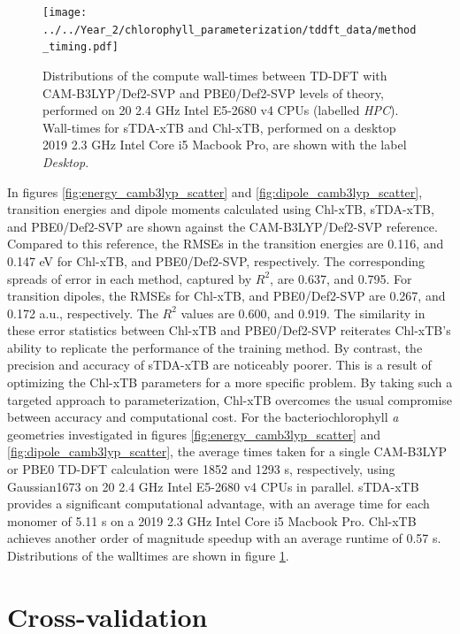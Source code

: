 \begin{figure}
    \centering
    \texttt{[image: ../../Year\_2/chlorophyll\_parameterization/tddft\_data/method\_timing.pdf]}
    \caption{Distributions of the compute wall-times between TD-DFT with CAM-B3LYP/Def2-SVP 
    and PBE0/Def2-SVP levels of theory, performed on 20 2.4 GHz Intel E5-2680 v4 CPUs (labelled \emph{HPC}).
    Wall-times for sTDA-xTB and Chl-xTB, performed on a desktop 2019 2.3 GHz Intel Core i5 Macbook Pro,
    are shown with the label \emph{Desktop}.}
    \label{fig:method_timing}
\end{figure}

In figures \ref{fig:energy_camb3lyp_scatter} and \ref{fig:dipole_camb3lyp_scatter}, 
transition energies and dipole moments calculated using Chl-xTB, sTDA-xTB, and PBE0/Def2-SVP
are shown against the CAM-B3LYP/Def2-SVP reference. Compared to this reference, 
the RMSEs in the transition energies are 0.116, and 0.147 eV for Chl-xTB, and PBE0/Def2-SVP,
respectively. The corresponding spreads of error in each method, captured by $R^2$,
are 0.637, and 0.795. For transition dipoles, the RMSEs for Chl-xTB, and PBE0/Def2-SVP
are 0.267, and 0.172 a.u., respectively. The $R^2$ values are 0.600, and 0.919. 
The similarity in these error statistics between Chl-xTB and PBE0/Def2-SVP reiterates 
Chl-xTB's ability to replicate the performance of the training method. By contrast,
the precision and accuracy of sTDA-xTB are noticeably poorer. This is a result of 
optimizing the Chl-xTB parameters for a more specific problem. By taking such a 
targeted approach to parameterization, Chl-xTB overcomes the usual compromise between 
accuracy and computational cost. For the bacteriochlorophyll \emph{a} geometries 
investigated in figures \ref{fig:energy_camb3lyp_scatter} and \ref{fig:dipole_camb3lyp_scatter},
the average times taken for a single CAM-B3LYP or PBE0 TD-DFT calculation were 1852
and 1293 s, respectively, using Gaussian1673 on 20 2.4 GHz Intel E5-2680 v4 CPUs 
in parallel. sTDA-xTB provides a significant computational advantage, with an average 
time for each monomer of 5.11 s on a 2019 2.3 GHz Intel Core i5 Macbook Pro. Chl-xTB 
achieves another order of magnitude speedup with an average runtime of 0.57 s. Distributions 
of the walltimes are shown in figure \ref{fig:method_timing}.

\afterpartskip
\section{Cross-validation}
\label{sec:chl_benchmarking}

